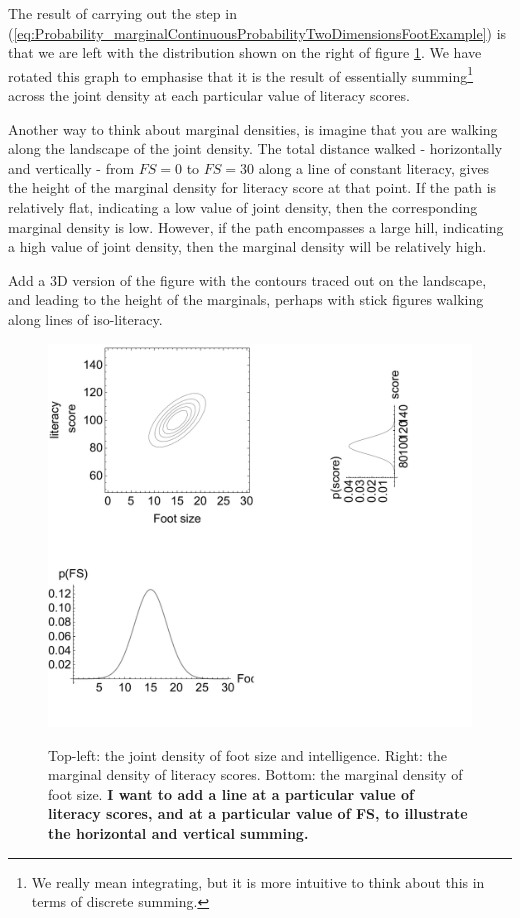 \documentclass[11pt,fullpage]{book}
\begin{document}
The result of carrying out the step in (\ref{eq:Probability_marginalContinuousProbabilityTwoDimensionsFootExample}) is that we are left with the distribution shown on the right of figure \ref{fig:Probability_footSizeIntelligenceMarginal}. We have rotated this graph to emphasise that it is the result of essentially summing\footnote{We really mean integrating, but it is more intuitive to think about this in terms of discrete summing.} across the joint density at each particular value of literacy scores. 

Another way to think about marginal densities, is imagine that you are walking along the landscape of the joint density. The total distance walked - horizontally and vertically - from $FS=0$ to $FS=30$ along a line of constant literacy, gives the height of the marginal density for literacy score at that point. If the path is relatively flat, indicating a low value of joint density, then the corresponding marginal density is low. However, if the path encompasses a large hill, indicating a high value of joint density, then the marginal density will be relatively high.

Add a 3D version of the figure with the contours traced out on the landscape, and leading to the height of the marginals, perhaps with stick figures walking along lines of iso-literacy.

\begin{figure}
\centering
\scalebox{0.5} 
{\includegraphics{Probability_footSizeIntelligenceMarginal.pdf}}
\caption{Top-left: the joint density of foot size and intelligence. Right: the marginal density of literacy scores. Bottom: the marginal density of foot size. \textbf{I want to add a line at a particular value of literacy scores, and at a particular value of FS, to illustrate the horizontal and vertical summing.}}\label{fig:Probability_footSizeIntelligenceMarginal}
\end{figure}
\end{document}
